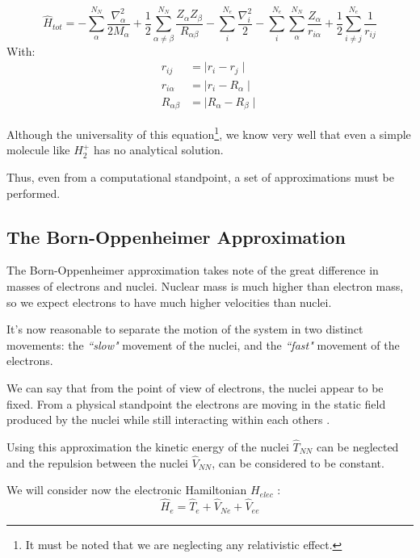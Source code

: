 \documentclass[a4paper,12pt]{article}
\begin{document}
\begin{equation}\label{eq:theHamiltonian}
\boxed{
	\hat{H}_{tot}   = - \sum_{\alpha}^{N_N} \frac{\nabla^2_{\alpha}}{2M_{\alpha}}
					+ \frac{1}{2}\sum_{\alpha \neq \beta}^{N_N} \frac{Z_{\alpha} Z_{\beta}} {R_{\alpha \beta}}
					- \sum_{i}^{N_e} \frac{\nabla_{i}^2}{2}
					- \sum_{i}^{N_e} \sum_{\alpha}^{N_N} \frac{ Z_{\alpha} }{r_{i \alpha}}				
					+ \frac{1}{2} \sum_{i \neq j}^{N_e} \frac{1}{r_{ij}}
}
\end{equation}
With:
\begin{align*}
	r_{ij} & = \mid r_{i} - r_{j} \mid 
\\
	r_{i \alpha} & = \mid r_{i} - R_{\alpha} \mid 
\\
	R_{\alpha \beta} & = \mid R_{\alpha} - R_{\beta} \mid 
\end{align*}

Although the universality of this equation\footnote{It must be noted that we are neglecting any relativistic effect.}, we know very well that even a simple molecule like $H_2^{+}$ has no analytical solution.

Thus, even from a computational standpoint, a set of approximations must be performed.


\subsection{The Born-Oppenheimer Approximation}

The Born-Oppenheimer approximation takes note of the great difference in masses of electrons and nuclei.
Nuclear mass is much higher than electron mass, so we expect electrons to have much higher velocities than	 nuclei. 

It's now reasonable to separate the motion of the system in two distinct movements: the \textit{``slow"} movement of the nuclei, and the \textit{``fast"} movement of the electrons.

We can say that from the point of view of electrons, the nuclei appear to be fixed. 
From a physical standpoint the electrons are moving in the static field produced by the nuclei while still interacting within each others \cite[p.241]{Atkins}.


Using this approximation the kinetic energy of the nuclei $\hat{T}_{NN}$ can be neglected and the repulsion between the nuclei $\hat{V}_{NN}$, can be considered to be constant.

We will consider now the electronic Hamiltonian $H_{elec}$ :
\begin{equation}
	\hat{H}_{e} = \hat{T}_{e} + \hat{V}_{Ne} + \hat{V}_{ee}
\end{equation}
\end{document}
